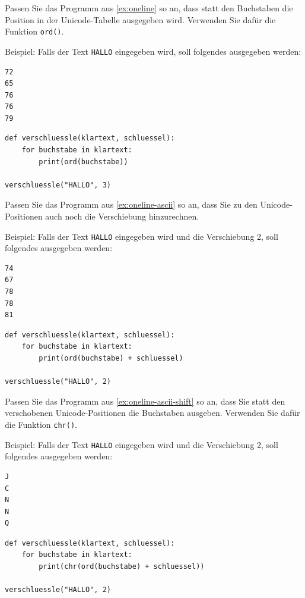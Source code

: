 \begin{myexercise}\label{ex:oneline-ascii}
Passen Sie das Programm aus \cref{ex:oneline} so an, dass statt den Buchstaben die Position in der Unicode-Tabelle ausgegeben wird. Verwenden Sie dafür die Funktion \lstinline|ord()|.

Beispiel: Falls der Text \texttt{HALLO} eingegeben wird, soll folgendes ausgegeben werden:
\begin{lstlisting}[language=bash]
72
65
76
76
79
\end{lstlisting}
\begin{myanswer}
\begin{lstlisting}
def verschluessle(klartext, schluessel):
    for buchstabe in klartext:
        print(ord(buchstabe))

verschluessle("HALLO", 3)
\end{lstlisting}
\end{myanswer}
\end{myexercise}

\begin{myexercise}\label{ex:oneline-ascii-shift}
Passen Sie das Programm aus \cref{ex:oneline-ascii} so an, dass Sie zu den Unicode-Positionen auch noch die Verschiebung hinzurechnen. 

Beispiel: Falls der Text \texttt{HALLO} eingegeben wird und die Verschiebung 2, soll folgendes ausgegeben werden:
\begin{lstlisting}[language=bash]
74
67
78
78
81
\end{lstlisting}
\begin{myanswer}
\begin{lstlisting}
def verschluessle(klartext, schluessel):
    for buchstabe in klartext:
        print(ord(buchstabe) + schluessel)

verschluessle("HALLO", 2)
\end{lstlisting}
\end{myanswer}
\end{myexercise}

\begin{myexercise}\label{ex:oneline-ascii-shift-char}
Passen Sie das Programm aus \cref{ex:oneline-ascii-shift} so an, dass Sie statt den verschobenen Unicode-Positionen die Buchstaben ausgeben. Verwenden Sie dafür die Funktion \lstinline|chr()|.
 

Beispiel: Falls der Text \texttt{HALLO} eingegeben wird und die Verschiebung 2, soll folgendes ausgegeben werden:
\begin{lstlisting}[language=bash]
J
C
N
N
Q
\end{lstlisting}
\begin{myanswer}
\begin{lstlisting}
def verschluessle(klartext, schluessel):
    for buchstabe in klartext:
        print(chr(ord(buchstabe) + schluessel))

verschluessle("HALLO", 2)
\end{lstlisting}
\end{myanswer}
\end{myexercise}

